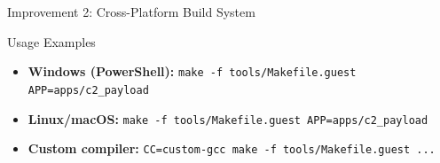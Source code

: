 \documentclass[aspectratio=169, 10pt]{beamer}
\begin{document}
\begin{frame}{Improvement 2: Cross-Platform Build System}
    \vspace{0.3cm}
    \begin{exampleblock}{Usage Examples}
        \begin{itemize}\setlength{\itemsep}{3pt}
            \item \textbf{Windows (PowerShell):} \texttt{make -f tools/Makefile.guest APP=apps/c2\_payload}
            \item \textbf{Linux/macOS:} \texttt{make -f tools/Makefile.guest APP=apps/c2\_payload}
            \item \textbf{Custom compiler:} \texttt{CC=custom-gcc make -f tools/Makefile.guest ...}
        \end{itemize}
    \end{exampleblock}
\end{frame}
\end{document}
